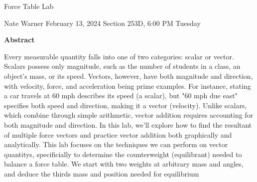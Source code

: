 \documentclass{report}
\title{\Huge{}}
\author{\huge{Nathan Warner}}
\date{\huge{}}
\begin{document}
    \begin{center}
        \begin{Huge}
            Force Table Lab
        \end{Huge}
        \begin{Large}
            \bigbreak \noindent 
            Nate Warner
            \smallbreak \noindent
            February 13, 2024
            \bigbreak \noindent 
            Section 253D, 6:00 PM Tuesday 
        \end{Large}
    \end{center}
    \pagebreak 
    \tableofcontents
    \pagebreak \bigbreak \noindent 
    \begin{center}
    \textbf{Abstract}
    \end{center}
    \begin{adjustwidth}{.3in}{.3in}
        \hspace{\parindent} Every measurable quantity falls into one of two categories: scalar or vector. Scalars possess only magnitude, such as the number of students in a class, an object's mass, or its speed. Vectors, however, have both magnitude and direction, with velocity, force, and acceleration being prime examples. For instance, stating a car travels at 60 mph describes its speed (a scalar), but "60 mph due east" specifies both speed and direction, making it a vector (velocity). Unlike scalars, which combine through simple arithmetic, vector addition requires accounting for both magnitude and direction. In this lab, we'll explore how to find the resultant of multiple force vectors and practice vector addition both graphically and analytically. This lab focuses on the techniques we can perform on vector quantitys, specificially to determine the counterweight (equilibrant) needed to balance a force table. We start with two weights at arbitrary mass and angles, and deduce the thirds mass and position needed for equilibrium 
    \end{adjustwidth}
\end{document}
